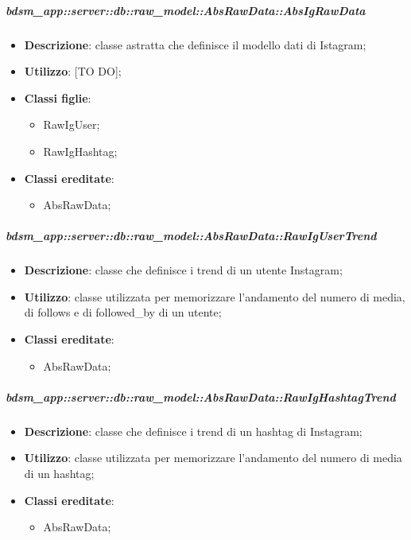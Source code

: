       \subparagraph{bdsm\_app::server::db::raw\_model::AbsRawData::AbsIgRawData} %
    \label{subp:bdsm_app_server_raw_model_AbsRawData_AbsIgRawData}
      \begin{itemize}
        \item \textbf{Descrizione}: classe astratta che definisce il modello dati di Istagram;
        \item \textbf{Utilizzo}: [TO DO];
        \item \textbf{Classi figlie}:
        \begin{itemize}
          \item RawIgUser;
          \item RawIgHashtag;
        \end{itemize}
        \item \textbf{Classi ereditate}:
        \begin{itemize}
          \item AbsRawData;
        \end{itemize}
      \end{itemize}
        \subparagraph{bdsm\_app::server::db::raw\_model::AbsRawData::RawIgUserTrend} %
    \label{subp:bdsm_app_server_raw_model_AbsRawData_RawIgUserTrend}
      \begin{itemize}
        \item \textbf{Descrizione}: classe che definisce i trend di un utente Instagram;
        \item \textbf{Utilizzo}: classe utilizzata per memorizzare l'andamento del numero di media, di follows e di followed\_by di un utente;
        \item \textbf{Classi ereditate}:
        \begin{itemize}
          \item AbsRawData;
        \end{itemize}
      \end{itemize}
    \subparagraph{bdsm\_app::server::db::raw\_model::AbsRawData::RawIgHashtagTrend} %
    \label{subp:bdsm_app_server_raw_model_AbsRawData_RawIgHashtagTrend}
      \begin{itemize}
        \item \textbf{Descrizione}: classe che definisce i trend di un hashtag di Instagram;
        \item \textbf{Utilizzo}: classe utilizzata per memorizzare l'andamento del numero di media di un hashtag;
        \item \textbf{Classi ereditate}:
        \begin{itemize}
          \item AbsRawData;
        \end{itemize}
      \end{itemize}


